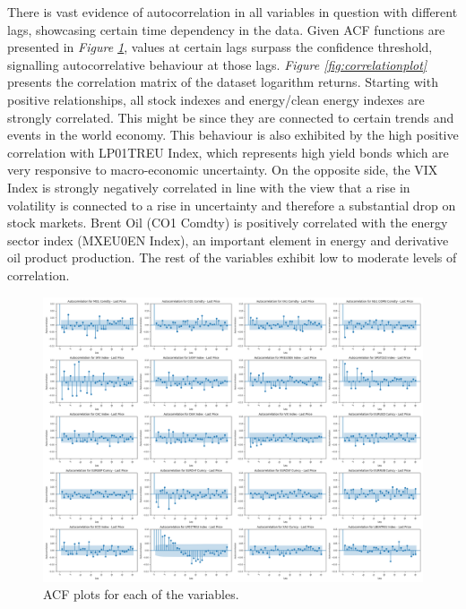 \documentclass[12pt, letterpaper]{article}
\begin{document}
There is vast evidence of autocorrelation in all variables in question with different lags, showcasing certain time dependency in the data. Given ACF functions are presented in \textit{Figure \ref{fig:acfplots}}, values at certain lags surpass the confidence threshold, signalling autocorrelative behaviour at those lags. \textit{Figure \ref{fig:correlationplot}} presents the correlation matrix of the dataset logarithm returns. Starting with positive relationships, all stock indexes and energy/clean energy indexes are strongly correlated. This might be since they are connected to certain trends and events in the world economy. This behaviour is also exhibited by the high positive correlation with LP01TREU Index, which represents high yield bonds which are very responsive to macro-economic uncertainty. On the opposite side, the VIX Index is strongly negatively correlated in line with the view that a rise in volatility is connected to a rise in uncertainty and therefore a substantial drop on stock markets. Brent Oil (CO1 Comdty) is positively correlated with the energy sector index (MXEU0EN Index), an important element in energy and derivative oil product production. The rest of the variables exhibit low to moderate levels of correlation.

\begin{figure}[H]
\centering
\includegraphics[width=1\textwidth]{graphics/acfplots.png}
\caption{ACF plots for each of the variables.}
\label{fig:acfplots}
\end{figure}
\end{document}
